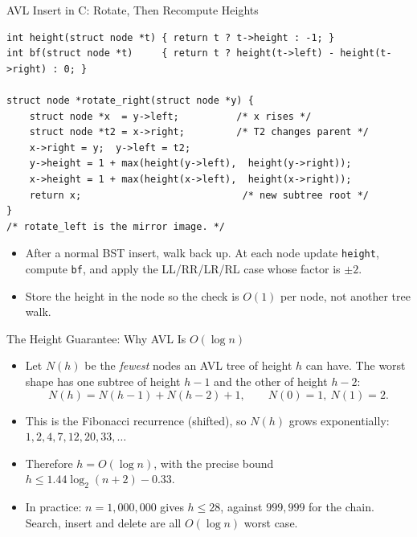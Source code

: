 \documentclass[aspectratio=169]{beamer}
\begin{document}
\begin{frame}[fragile]{AVL Insert in C: Rotate, Then Recompute Heights}
  \scriptsize
\begin{verbatim}
int height(struct node *t) { return t ? t->height : -1; }
int bf(struct node *t)     { return t ? height(t->left) - height(t->right) : 0; }

struct node *rotate_right(struct node *y) {
    struct node *x  = y->left;          /* x rises */
    struct node *t2 = x->right;         /* T2 changes parent */
    x->right = y;  y->left = t2;
    y->height = 1 + max(height(y->left),  height(y->right));
    x->height = 1 + max(height(x->left),  height(x->right));
    return x;                            /* new subtree root */
}
/* rotate_left is the mirror image. */
\end{verbatim}
  \vspace{-0.1cm}
  \footnotesize
  \begin{itemize}
    \item After a normal BST insert, walk back up. At each node update
      \texttt{height}, compute \texttt{bf}, and apply the LL/RR/LR/RL case
      whose factor is $\pm2$.
    \item Store the height in the node so the check is $O(1)$ per node,
      not another tree walk.
  \end{itemize}
\end{frame}

\begin{frame}{The Height Guarantee: Why AVL Is $O(\log n)$}
  \begin{itemize}
    \item Let $N(h)$ be the \emph{fewest} nodes an AVL tree of height $h$
      can have. The worst shape has one subtree of height $h-1$ and the
      other of height $h-2$:
      \[
        N(h) = N(h-1) + N(h-2) + 1,\qquad N(0)=1,\ N(1)=2.
      \]
    \item This is the Fibonacci recurrence (shifted), so $N(h)$ grows
      exponentially: $1, 2, 4, 7, 12, 20, 33, \dots$
    \item Therefore $h = O(\log n)$, with the precise bound
      $h \le 1.44\log_2(n+2) - 0.33$.
    \item In practice: $n=1{,}000{,}000$ gives $h\le 28$, against
      $999{,}999$ for the chain. Search, insert and delete are all
      $O(\log n)$ worst case.
  \end{itemize}
\end{frame}
\end{document}
